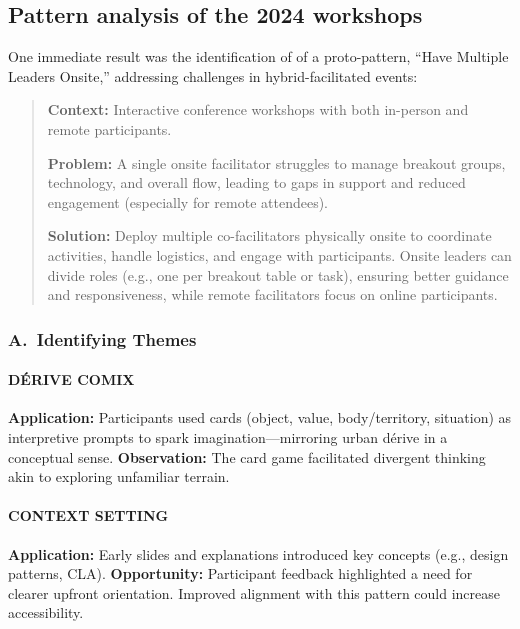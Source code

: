 \documentclass[acmlarge,timestamp]{acmart}
\begin{document}
{\subsection*{Pattern analysis of the 2024 workshops}

One immediate result was the identification of of a proto-pattern,
“Have Multiple Leaders Onsite,” addressing challenges in
hybrid-facilitated events:

\begin{quote}
\textbf{Context:} Interactive conference workshops with both in-person and
remote participants.

\textbf{Problem:} A single onsite facilitator struggles to manage breakout
groups, technology, and overall flow, leading to gaps in support and
reduced engagement (especially for remote attendees).

\textbf{Solution:} Deploy multiple co-facilitators physically onsite to
coordinate activities, handle logistics, and engage with
participants. Onsite leaders can divide roles (e.g., one per breakout
table or task), ensuring better guidance and responsiveness, while
remote facilitators focus on online participants.
\end{quote}


\medskip

\subsubsection*{A.~Identifying Themes}

\paragraph*{DÉRIVE COMIX}

\noindent \textbf{Application:} Participants used cards (object, value, body/territory, situation) as interpretive prompts to spark imagination—mirroring  urban dérive in a conceptual sense. \textbf{Observation:} The card game facilitated divergent thinking akin to exploring unfamiliar terrain.

\paragraph*{CONTEXT SETTING}

\noindent \textbf{Application:} Early slides and explanations introduced key concepts (e.g., design patterns, CLA). \textbf{Opportunity:} Participant feedback highlighted a need for clearer upfront orientation. Improved alignment with this pattern could increase accessibility.

}
\end{document}
